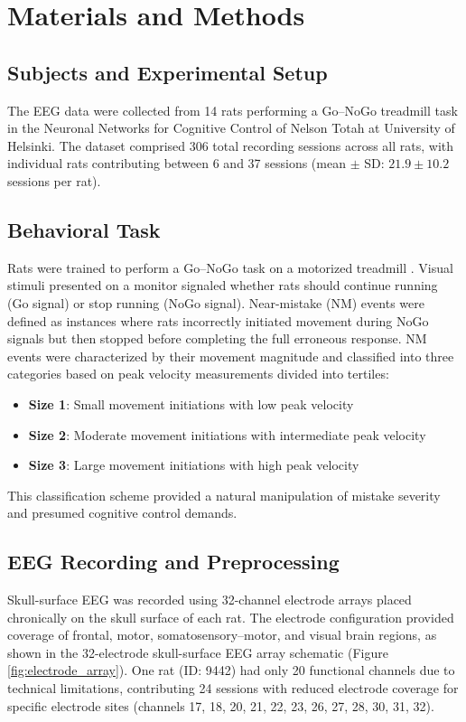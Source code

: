 \documentclass[11pt]{article}
\begin{document}
\section{Materials and Methods}

\subsection{Subjects and Experimental Setup}

The EEG data were collected from 14 rats performing a Go–NoGo treadmill task in the Neuronal Networks for Cognitive Control of Nelson Totah at University of Helsinki. The dataset comprised 306 total recording sessions across all rats, with individual rats contributing between 6 and 37 sessions (mean $\pm$ SD: $21.9 \pm 10.2$ sessions per rat).

\subsection{Behavioral Task}

Rats were trained to perform a Go–NoGo task on a motorized treadmill \citep{doutel2024volitional}. Visual stimuli presented on a monitor signaled whether rats should continue running (Go signal) or stop running (NoGo signal). Near-mistake (NM) events were defined as instances where rats incorrectly initiated movement during NoGo signals but then stopped before completing the full erroneous response. 
NM events were characterized by their movement magnitude and classified into three categories based on peak velocity measurements divided into tertiles:
\begin{itemize}
\item \textbf{Size 1}: Small movement initiations with low peak velocity
\item \textbf{Size 2}: Moderate movement initiations with intermediate peak velocity
\item \textbf{Size 3}: Large movement initiations with high peak velocity
\end{itemize}

This classification scheme provided a natural manipulation of mistake severity and presumed cognitive control demands.

\subsection{EEG Recording and Preprocessing}

Skull-surface EEG was recorded using 32-channel electrode arrays placed chronically on the skull surface of each rat. The electrode configuration provided coverage of frontal, motor, somatosensory–motor, and visual brain regions, as shown in the 32-electrode skull-surface EEG array schematic (Figure \ref{fig:electrode_array}). One rat (ID: 9442) had only 20 functional channels due to technical limitations, contributing 24 sessions with reduced electrode coverage for specific electrode sites (channels 17, 18, 20, 21, 22, 23, 26, 27, 28, 30, 31, 32).
\end{document}
